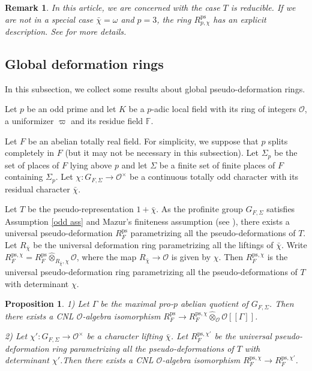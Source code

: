 \documentclass[a4paper, 12pt]{amsart}
\newtheorem{prop}[thm]{Proposition}
\newtheorem{rem}[thm]{\bf Remark}
\def\ps{\mathrm{ps}}
\newcommand{\cO}{\mathcal{O}}
\begin{document}
	\begin{rem}
		 In this article, we are concerned with the case $T$ is reducible. If we are not in a special case $\bar{\chi}=\omega$ and $p=3$, the ring $R_{p, \chi}^{\ps}$ has an explicit description. See \cite[Corollary 9.13, B.5,  Proposition B.17 and Remark B.28]{Pa_k_nas_2013} for more details.
		
	\end{rem}
	
	\subsection{Global deformation rings}
	In this subsection, we collect some results about global pseudo-deformation rings.
	
	Let $p$ be an odd prime and let $K$ be a $p$-adic local field with its ring of integers $\mathcal{O}$, a uniformizer $\varpi$ and its residue field $\mathbb{F}$. 
	
	Let $F$ be an abelian totally real field. For simplicity, we suppose that $p$ splits completely in $F$ (but it may not be necessary in this subsection). Let $\Sigma_p$ be the set of places of $F$ lying above $p$ and let $\Sigma$ be a finite set of finite places of $F$ containing $\Sigma_p$. Let $\chi :G_{F, \Sigma} \to \mathcal{O}^\times$ be a continuous totally odd character with its residual character $\bar{\chi}$.
	
	Let $T$ be the pseudo-representation $1+\bar{\chi}$. As the profinite group $G_{F, \Sigma} $ satisfies Assumption \ref{odd ass} and Mazur's finiteness assumption (see \cite[Corollary 10.11.15]{Neukirch_2008}), there exists a universal pseudo-deformation $R_{F}^{\ps}$ parametrizing all the pseudo-deformations of $T$. Let $R_{\bar{\chi}}$ be the universal deformation ring parametrizing all the liftings of $\bar{\chi}$. Write $ R_{F}^{\ps, \chi} = R_{F}^{\ps} \widehat{\otimes}_{R_{\bar{\chi}}, \chi} \cO$, where the map $R_{\bar{\chi}} \to \cO $ is given by $\chi$. Then $ R_{F}^{\ps, \chi}$ is the universal pseudo-deformation ring parametrizing all the pseudo-deformations of $T$ with determinant $\chi$.
		
    \begin{prop}\label{det}
    	1) Let $\Gamma$ be the maximal pro-$p$ abelian quotient of $G_{F, \Sigma} $. Then there exists a CNL $\cO$-algebra isomorphism $R_{F}^{\ps} \to R_{F}^{\ps, \chi} \widehat{\otimes}_\cO \cO[[\Gamma]] $.
    	
    	2) Let $\chi': G_{F,\Sigma} \to \cO^\times$ be a character lifting $\bar{\chi}$. Let $R_{F}^{\ps, \chi'}$ be the universal pseudo-deformation ring parametrizing all the pseudo-deformations of $T$ with determinant $\chi'$.Then there exists a CNL $\cO$-algebra isomorphism $ R_{F}^{\ps, \chi} \to R_{F}^{\ps, \chi'}$.
    \end{prop}
	
\end{document}
